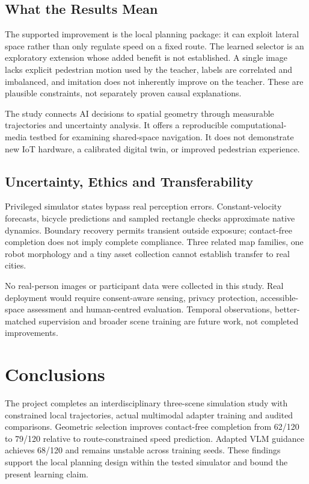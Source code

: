\documentclass[a4paper,12pt]{article}
\begin{document}
\subsection{What the Results Mean}
The supported improvement is the local planning package: it can exploit lateral space rather than only regulate speed on a fixed route. The learned selector is an exploratory extension whose added benefit is not established. A single image lacks explicit pedestrian motion used by the teacher, labels are correlated and imbalanced, and imitation does not inherently improve on the teacher. These are plausible constraints, not separately proven causal explanations.

The study connects AI decisions to spatial geometry through measurable trajectories and uncertainty analysis. It offers a reproducible computational-media testbed for examining shared-space navigation. It does not demonstrate new IoT hardware, a calibrated digital twin, or improved pedestrian experience.

\subsection{Uncertainty, Ethics and Transferability}
Privileged simulator states bypass real perception errors. Constant-velocity forecasts, bicycle predictions and sampled rectangle checks approximate native dynamics. Boundary recovery permits transient outside exposure; contact-free completion does not imply complete compliance. Three related map families, one robot morphology and a tiny asset collection cannot establish transfer to real cities.

No real-person images or participant data were collected in this study. Real deployment would require consent-aware sensing, privacy protection, accessible-space assessment and human-centred evaluation. Temporal observations, better-matched supervision and broader scene training are future work, not completed improvements.

\section{Conclusions}
The project completes an interdisciplinary three-scene simulation study with constrained local trajectories, actual multimodal adapter training and audited comparisons. Geometric selection improves contact-free completion from 62/120 to 79/120 relative to route-constrained speed prediction. Adapted VLM guidance achieves 68/120 and remains unstable across training seeds. These findings support the local planning design within the tested simulator and bound the present learning claim.
\end{document}
